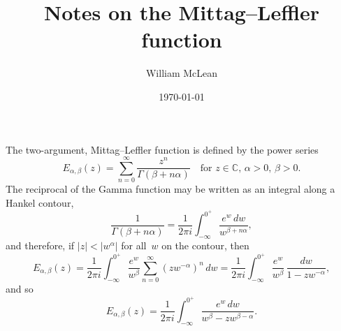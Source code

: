 \documentclass[12pt,a4paper]{article}
\title{Notes on the Mittag--Leffler function}
\author{William McLean}
\date{\today}
\begin{document}
\maketitle
The two-argument, Mittag--Leffler function is defined by the power series
\[
E_{\alpha,\beta}(z)=\sum_{n=0}^\infty\frac{z^n}{\Gamma(\beta+n\alpha)}
\quad\text{for $z\in\mathbb{C}$, $\alpha>0$, $\beta>0$.}
\]
The reciprocal of the Gamma function may be written as an integral along a
Hankel contour,
\[
\frac{1}{\Gamma(\beta+n\alpha)}=\frac{1}{2\pi i}\int_{-\infty}^{0^+}
    \frac{e^w\,dw}{w^{\beta+n\alpha}},
\]
and therefore, if $|z|<|w^\alpha|$ for all~$w$ on the contour, then
\[
E_{\alpha,\beta}(z)=\frac{1}{2\pi i}\int_{-\infty}^{0^+}\frac{e^w}{w^\beta}
    \sum_{n=0}^\infty(zw^{-\alpha})^n\,dw
    =\frac{1}{2\pi i}\int_{-\infty}^{0^+}\frac{e^w}{w^\beta}\,
    \frac{dw}{1-zw^{-\alpha}},
\]
and so
\begin{equation}\label{eq: integral repn}
E_{\alpha,\beta}(z)=\frac{1}{2\pi i}\int_{-\infty}^{0^+}
    \frac{e^w\,dw}{w^\beta-zw^{\beta-\alpha}}.
\end{equation}


\end{document}
